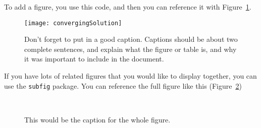 \documentclass[11pt]{article}
\begin{document}
\newpage

To add a figure, you use this code, and then you can reference it with Figure~\ref{fig:converging}.

\begin{figure}[htbp]
\begin{center}
\texttt{[image: convergingSolution]}
\caption{Don't forget to put in a good caption. Captions should be about two complete sentences, and explain what the figure or table is, and why it was important to include in the document.}
\label{fig:converging}
\end{center}
\end{figure}

If you have lots of related figures that you would like to display together, you can use the \texttt{subfig} package. You can reference the full figure like this (Figure~\ref{fig:withSubfigs})

\begin{figure}[htbp]
\begin{center}
	 \qquad 
       	 \\
	 \qquad
\caption{This would be the caption for the whole figure.}
\label{fig:withSubfigs}
\end{center}
\end{figure}
\end{document}
